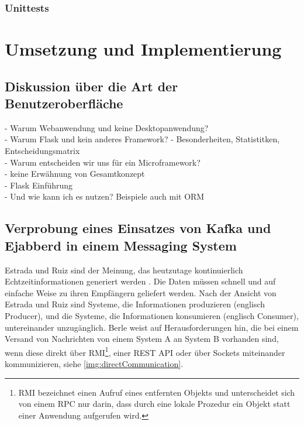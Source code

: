 \documentclass[a4paper,titlepage,halfparskip,12pt]{scrreprt}
\begin{document}
\begin{onehalfspacing}
\subsection{Unittests}
\label{Unittests}

\chapter{Umsetzung und Implementierung}
\label{chap:Umsetzung}

\section{Diskussion über die Art der Benutzeroberfläche}
\label{sec:DiskussionGUI}

- Warum Webanwendung und keine Desktopanwendung?\\
- Warum Flask und kein anderes Framework? - Besonderheiten, Statistitken, Entscheidungsmatrix\\
- Warum entscheiden wir uns für ein Microframework?\\
- keine Erwähnung von Gesamtkonzept\\
- Flask Einführung\\
- Und wie kann ich es nutzen? Beispiele auch mit ORM\\

\pagebreak

\section{Verprobung eines Einsatzes von Kafka und Ejabberd in einem Messaging System}
\label{sec:VerprbungIMS}

Estrada und Ruiz sind der Meinung, das heutzutage kontinuierlich Echtzeitinformationen generiert werden \cite{estradaRuiz2016}. Die Daten müssen schnell und auf einfache Weise zu ihren Empfängern geliefert werden. Nach der Ansicht von Estrada und Ruiz \cite{estradaRuiz2016} sind Systeme, die Informationen produzieren (englisch Producer), und die Systeme, die Informationen konsumieren (englisch Consumer), untereinander unzugänglich. Berle \cite{berleKafkaOverview} weist auf Herausforderungen hin, die bei einem Versand von Nachrichten von einem System A an System B vorhanden sind, wenn diese direkt über \acs{RMI}\footnote{\ac{RMI} bezeichnet einen Aufruf eines entfernten Objekts und unterscheidet sich von einem \ac{RPC} nur darin, dass durch eine lokale Prozedur ein Objekt statt einer Anwendung aufgerufen wird.\cite[S.41]{andrew2008verteilte}}, einer \acs{REST} \acs{API} oder über Sockets miteinander kommunizieren, siehe \autoref{img:directCommunication}.


\end{onehalfspacing}
\end{document}
